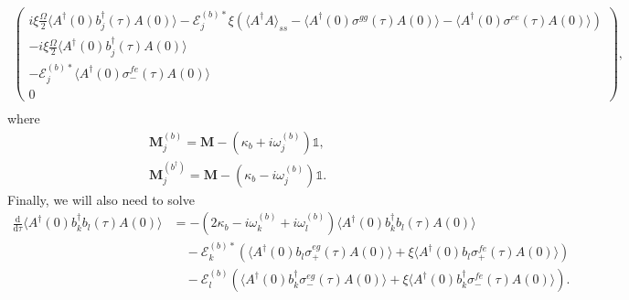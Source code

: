 \documentclass{article}
\newcommand{\ddtau}{\frac{\mathrm{d}}{\mathrm{d}\tau}}
\begin{document}
\begin{subequations}
\begin{align}
\begin{pmatrix}
			i \xi \frac{\Omega}{2} \langle A^{\dagger}(0) b_{j}^{\dagger}(\tau) A(0) \rangle - \mathcal{E}_{j}^{(b) *} \xi \left( \langle A^{\dagger} A \rangle_{ss} - \langle A^{\dagger}(0) \sigma^{gg}(\tau) A(0) \rangle - \langle A^{\dagger}(0) \sigma^{ee}(\tau) A(0) \rangle \right) \\
			-i \xi \frac{\Omega}{2} \langle A^{\dagger}(0) b_{j}^{\dagger}(\tau) A(0) \rangle \\
			-\mathcal{E}_{j}^{(b) *} \langle A^{\dagger}(0) \sigma^{fe}_{-}(\tau) A(0) \rangle \\
			0
		\end{pmatrix} , \\
	\end{align}
\end{subequations}
where
\begin{subequations}
	\begin{gather}
		\bm{M}_{j}^{(b)} = \bm{M} - \left( \kappa_{b} + i \omega_{j}^{(b)} \right) \mathbb{1}, \\
		\bm{M}_{j}^{(b^{\dagger})} = \bm{M} - \left( \kappa_{b} - i \omega_{j}^{(b)} \right) \mathbb{1}.
	\end{gather}
\end{subequations}
Finally, we will also need to solve
\begin{align}
	\ddtau \langle A^{\dagger}(0) b^{\dagger}_{k} b_{l}(\tau) A(0) \rangle &= -\left( 2 \kappa_{b} - i \omega_{k}^{(b)} + i \omega_{l}^{(b)} \right) \langle A^{\dagger}(0) b^{\dagger}_{k} b_{l}(\tau) A(0) \rangle \nonumber \\
	&\quad -\mathcal{E}_{k}^{(b) *} \left( \langle A^{\dagger}(0) b_{l} \sigma^{eg}_{+}(\tau) A(0) \rangle + \xi \langle A^{\dagger}(0) b_{l} \sigma^{fe}_{+}(\tau) A(0) \rangle \right) \nonumber \\
	&\quad - \mathcal{E}_{l}^{(b)} \left( \langle A^{\dagger}(0) b_{k}^{\dagger} \sigma^{eg}_{-}(\tau) A(0) \rangle + \xi \langle A^{\dagger}(0) b_{k}^{\dagger} \sigma^{fe}_{-}(\tau) A(0) \rangle \right).
\end{align}
\end{document}

